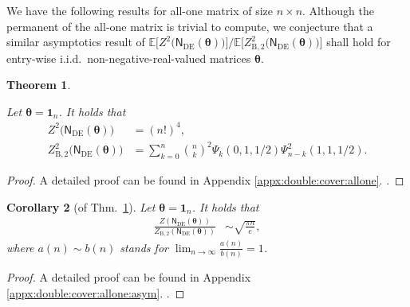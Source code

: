\documentclass[conference]{IEEEtran}
\theoremstyle{plain}
\newtheorem{thm}{Theorem}
\newtheorem{corollary}[thm]{Corollary}
\theoremstyle{definition}
\newcommand{\B}{\mathrm{B}}
\newcommand{\E}{\mathbb {E}}
\newcommand{\sfn}{\mathsf{N}}
\newcommand{\btheta}{\boldsymbol{\theta}}
\newcommand{\sfnDE}{\sfn_{\mathrm{DE}}}
\begin{document}
We have the following results for all-one matrix of size $n\times n$. Although
the permanent of the all-one matrix is trivial to compute, we conjecture that a
similar asymptotics result of $\E\bigl[ Z^2\bigl( \sfnDE(\btheta) \bigr) \bigr]
/ \E \bigl[ Z_{\B,2}^2\bigl( \sfnDE(\btheta) \bigr) \bigr]$ shall hold for
entry-wise i.i.d.~non-negative-real-valued matrices $\btheta$.


\begin{thm}
 \label{thm:double:cover:allone}

 Let $\btheta=\mathbf 1_n$. It holds that
 \begin{align*}
  Z^2\bigl(\sfnDE(\btheta)\bigr)
   & = (n!)^4,\nonumber                                                       \\
  Z_{\B,2}^2\bigl(\sfnDE(\btheta)\bigr)
   & = \sum_{k=0}^{n} \binom{n}{k}^2 \Psi_{k}(0,1,1/2) \Psi_{n-k}^2(1,1,1/2).
 \end{align*}
\end{thm}


\begin{proof}
 A detailed proof can be found in \iflongversion Appendix
 \ref{appx:double:cover:allone}. \else \cite{zhou2026}. \fi
\end{proof}


\begin{corollary}[of Thm.~\ref{thm:double:cover:allone}]
 \label{cor:double:cover:allone}
 Let $\btheta=\mathbf 1_n$. It holds that
 \begin{align*}
  \frac{Z(\sfnDE(\btheta))}{Z_{\B,2}(\sfnDE(\btheta))}
   & \sim\sqrt{\frac{\pi n}{e}},
 \end{align*}
 where $a(n) \sim b(n)$ stands for
 $\lim_{n \to \infty} \frac{a(n)}{b(n)} = 1$.
\end{corollary}


\begin{proof}
  A detailed proof can be found in \iflongversion Appendix
 \ref{appx:double:cover:allone:asym}. \else \cite{zhou2026}. \fi
\end{proof}
\end{document}
